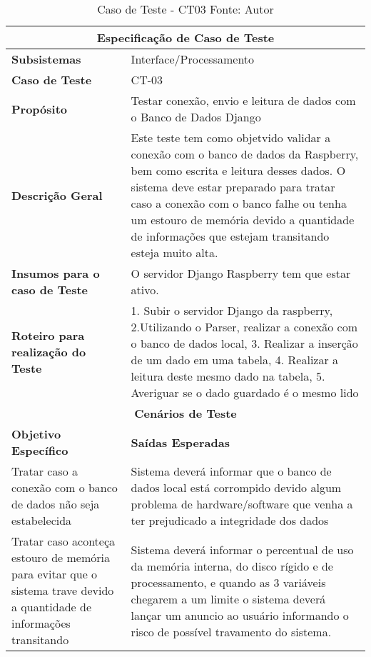 \begin{table}[H]
    \begin{center}
        \begin{tabular}{|p{5cm}|p{12cm}|}
            \hline
            \multicolumn{2}{|c|}{\textbf{Especificação de Caso de Teste}} \\ \hline
                \textbf{Subsistemas}                               & Interface/Processamento\\ \hline
                \textbf{Caso de Teste}                             & CT-03 \\ \hline
                \textbf{Propósito}                                     & Testar conexão, envio e leitura de dados com o Banco de Dados Django \\ \hline
                \textbf{Descrição Geral}                           & Este teste tem como objetvido validar a conexão com o banco de dados da Raspberry, bem como escrita e leitura desses dados. O sistema deve estar preparado para tratar caso a conexão com o banco falhe ou tenha um estouro de memória devido a quantidade de informações que estejam transitando esteja muito alta. \\ \hline
                \textbf{Insumos para o caso de Teste}    & O servidor Django Raspberry tem que estar ativo. \\ \hline
                \textbf{Roteiro para realização do Teste}&  1. Subir o servidor Django da raspberry, 2.Utilizando o Parser, realizar a conexão com o banco de dados local, 3. Realizar a inserção de um dado em uma tabela, 4. Realizar a leitura deste mesmo dado na tabela, 5. Averiguar se o dado guardado é o mesmo lido  \\ \hline
            \multicolumn{2}{|c|}{\textbf{Cenários de Teste}} \\ \hline
                \textbf{Objetivo Específico}                      & \textbf{Saídas Esperadas} \\ \hline
                Tratar caso a conexão com o banco de dados não seja estabelecida & Sistema deverá informar que o banco de dados local está corrompido devido algum problema de hardware/software que venha a ter prejudicado a integridade dos dados \\ \hline
                Tratar caso aconteça estouro de memória para evitar que o sistema trave devido a quantidade de informações transitando & Sistema deverá informar o percentual de uso da memória interna, do disco rígido e de processamento, e quando as 3 variáveis chegarem a um limite o sistema deverá lançar um anuncio ao usuário informando o risco de possível travamento do sistema.  \\ \hline
        \end{tabular}
    \end{center}
    \caption[Caso de Teste - CT03]{Caso de Teste - CT03
    \protect Fonte: Autor}
    \label{CT-03}
\end{table}

